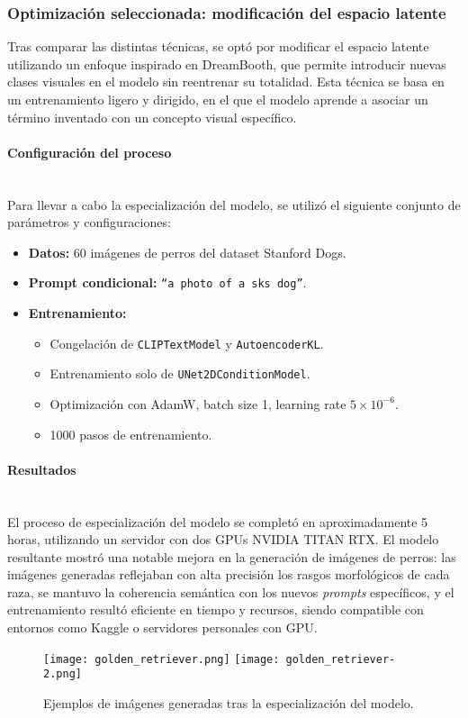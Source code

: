 \subsubsection{Optimización seleccionada: modificación del espacio latente}
Tras comparar las distintas técnicas, se optó por modificar el espacio latente utilizando un enfoque inspirado en DreamBooth, que permite introducir nuevas clases visuales en el modelo sin reentrenar su totalidad. Esta técnica se basa en un entrenamiento ligero y dirigido, en el que el modelo aprende a asociar un término inventado con un concepto visual específico.

\paragraph{\textbf{Configuración del proceso}} \mbox{}\\[0.5em]
Para llevar a cabo la especialización del modelo, se utilizó el siguiente conjunto de parámetros y configuraciones:
\begin{itemize}
\item \textbf{Datos:} 60 imágenes de perros del dataset Stanford Dogs.
\item \textbf{Prompt condicional:} \texttt{``a photo of a sks dog''}.
\item \textbf{Entrenamiento:}
\begin{itemize}
\item Congelación de \texttt{CLIPTextModel} y \texttt{AutoencoderKL}.
\item Entrenamiento solo de \texttt{UNet2DConditionModel}.
\item Optimización con AdamW, batch size 1, learning rate $5\times10^{-6}$.
\item 1000 pasos de entrenamiento.
\end{itemize}
\end{itemize}

\paragraph{\textbf{Resultados}} \mbox{}\\[0.5em]
El proceso de especialización del modelo se completó en aproximadamente 5 horas, utilizando un servidor con dos GPUs NVIDIA TITAN RTX. El modelo resultante mostró una notable mejora en la generación de imágenes de perros: las imágenes generadas reflejaban con alta precisión los rasgos morfológicos de cada raza, se mantuvo la coherencia semántica con los nuevos \textit{prompts} específicos, y el entrenamiento resultó eficiente en tiempo y recursos, siendo compatible con entornos como Kaggle o servidores personales con GPU.


\begin{figure}[H]
\centering
\texttt{[image: golden\_retriever.png]}
\hfill
\texttt{[image: golden\_retriever-2.png]}
\caption{Ejemplos de imágenes generadas tras la especialización del modelo.}
\label{fig:latent-space-optimization}
\end{figure}


